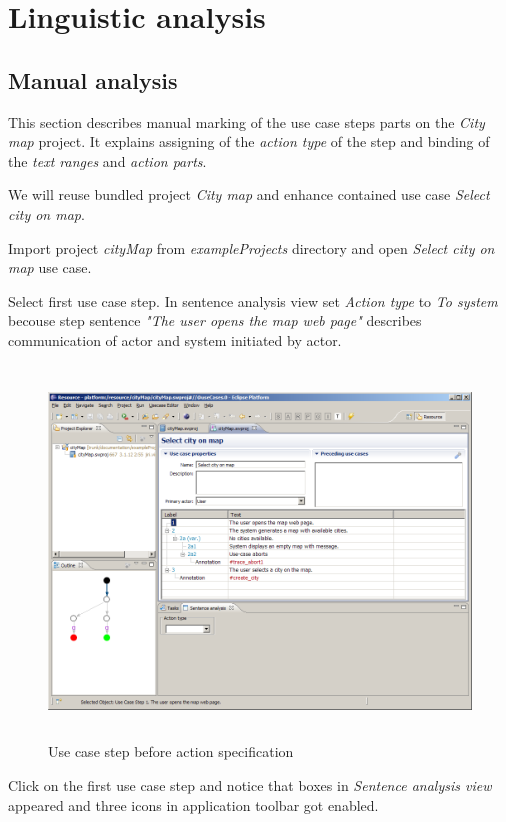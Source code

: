 \section{Linguistic analysis}

\subsection{Manual analysis}
This section describes manual marking of the use case steps parts on the \emph{City map} project. 
It explains assigning of the \emph{action type} of the step and binding of the \emph{text ranges} and \emph{action parts}.

We will reuse bundled project \emph{City map} and enhance contained use case \emph{Select city on map}. 

Import project \emph{cityMap} from \emph{exampleProjects} directory and open \emph{Select city on map} use case.

Select first use case step. In sentence analysis view set \emph{Action type} to \emph{To system}
becouse step sentence \emph{"The user opens the map web page"} describes communication of actor and system initiated by actor.

\begin{figure}[ht]
  \centering
  \includegraphics[height=280pt]{images/manual-analysis/step1-action-not-selected}
  \caption{Use case step before action specification}
\end{figure}

Click on the first use case step and notice that boxes in \emph{Sentence analysis view} appeared and three icons in application toolbar got enabled.


